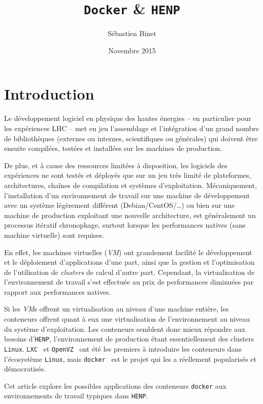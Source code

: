 \documentclass[a4paper]{article}
\title{\texttt{Docker} \& \texttt{HENP}}
\author{S\'ebastien Binet}
\date{Novembre 2015}
\affil{CNRS/IN2P3/LPC}
\begin{document}
\maketitle

\section*{Introduction}
Le d\'eveloppement logiciel en physique des hautes \'energies -- en particulier
pour les exp\'eriences LHC -- met en jeu l'assemblage et l'int\'egration d'un
grand nombre de biblioth\`eques (externes ou internes, scientifiques ou
g\'en\'erales) qui doivent \^etre ensuite compil\'ees, test\'ees et install\'ees
sur les machines de production.

De plus, et \`a cause des ressources limit\'ees \`a disposition, les logiciels
des exp\'eriences ne sont test\'es et d\'eploy\'es que sur un jeu tr\`es
limit\'e de plateformes, architectures, cha\^ines de compilation et syst\`emes
d'exploitation.
M\'ecaniquement, l'installation d'un environnement de travail sur une machine de
d\'eveloppement avec un syst\`eme l\'eg\`erement diff\'erent
(Debian/CentOS/\ldots) ou bien sur une
machine de production exploitant une nouvelle architecture, est g\'en\'eralement
un processus it\'eratif chronophage, surtout lorsque les performances natives
(sans machine virtuelle) sont requises.

En effet, les machines virtuelles (\emph{VM}) ont grandement facilit\'e le
d\'evelop\-pement et le d\'eploiement d'applications d'une part, ainsi que la
gestion et l'optimisation de l'utilisation de \emph{clusters} de calcul d'autre
part.
Cependant, la virtualisation de l'environnement de travail s'est effectu\'ee au
prix de performances diminu\'ees par rapport aux performances natives.

Si les \emph{VM}s offrent un virtualisation au niveau d'une machine enti\`ere,
les conteneurs offrent quant \`a eux une virtualisation de l'environnement au
niveau du syst\`eme d'exploitation.
Les conteneurs semblent donc mieux r\'epondre aux besoins d'\texttt{HENP},
l'environnement de production \'etant essentiellement des clusters
\texttt{Linux}.
\texttt{LXC}~\cite{ref-lxc} et \texttt{OpenVZ}~\cite{ref-openvz} ont \'et\'e les
premiers \`a introduire les conteneurs dans l'\'ecosyst\`eme \texttt{Linux}, mais
\texttt{docker}~\cite{ref-docker} est le projet qui les a r\'eellement
popularis\'es et d\'emocratis\'es.

Cet article explore les possibles applications des conteneurs \texttt{docker}
aux environnements de travail typiques dans \texttt{HENP}.
\end{document}
